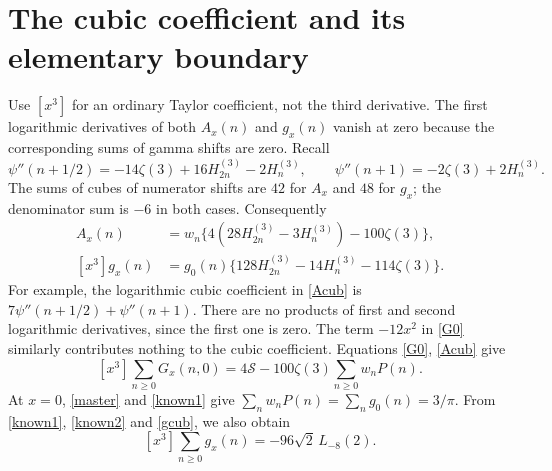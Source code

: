 \documentclass[11pt,a4paper]{article}
\newcommand{\Li}{L_{-8}(2)}\newcommand{\hh}{H^{(3)}}
\begin{document}
\section{The cubic coefficient and its elementary boundary}
Use $[x^3]$ for an ordinary Taylor coefficient, not the third derivative.
The first logarithmic derivatives of both $A_x(n)$ and $g_x(n)$ vanish
at zero because the corresponding sums of gamma shifts are zero.
Recall
\[
 \psi''(n+1/2)=-14\zeta(3)+16H_{2n}^{(3)}-2H_n^{(3)},\qquad
 \psi''(n+1)=-2\zeta(3)+2H_n^{(3)}.
\]
The sums of cubes of numerator shifts are $42$ for $A_x$ and $48$ for
$g_x$; the denominator sum is $-6$ in both cases. Consequently
\begin{align}
 [x^3]A_x(n)&=w_n\{4(28H_{2n}^{(3)}-3H_n^{(3)})-100\zeta(3)\},\label{Acub}\\
 [x^3]g_x(n)&=g_0(n)\{128H_{2n}^{(3)}-14H_n^{(3)}-114\zeta(3)\}.\label{gcub}
\end{align}
For example, the logarithmic cubic coefficient in \eqref{Acub} is
$7\psi''(n+1/2)+\psi''(n+1)$. There are no products of first and second
logarithmic derivatives, since the first one is zero. The term $-12x^2$
in \eqref{G0} similarly contributes nothing to the cubic coefficient.
Equations \eqref{G0}, \eqref{Acub} give
\begin{equation}\label{leftcub}
 [x^3]\sum_{n\ge0}G_x(n,0)=4\mathcal S-100\zeta(3)\sum_{n\ge0}w_nP(n).
\end{equation}
At $x=0$, \eqref{master} and \eqref{known1} give
$\sum_nw_nP(n)=\sum_ng_0(n)=3/\pi$.
From \eqref{known1}, \eqref{known2} and \eqref{gcub}, we also obtain
\begin{equation}\label{rightcub}
 [x^3]\sum_{n\ge0}g_x(n)=-96\sqrt2\,\Li.
\end{equation}
\end{document}
